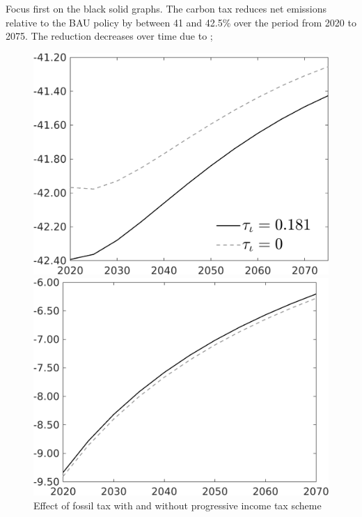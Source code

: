 Focus first on the black solid graphs. The carbon tax reduces net emissions relative to the BAU policy by between 41 and 42.5\% over the period from 2020 to 2075. The reduction decreases over time due to 
; 
\begin{figure}[h!!]
	\centering
	\caption{Effect of fossil tax with and without progressive income tax scheme}\label{fig:CompRegimes}
	\begin{minipage}[]{0.32\textwidth}
		\includegraphics[width=1\textwidth]{../../codding_model/own_basedOnFried/optimalPol_010922_revision/figures/all_13Sept22/PerdifNoTauf_regime0_CompTaul_Emnet_spillover0_nsk0_xgr0_sep1_LFlimit0_emsbase1_countec0_GovRev1_etaa0.79_lgd1.png}
	\end{minipage}	
\begin{minipage}[]{0.32\textwidth}
	\includegraphics[width=1\textwidth]{../../codding_model/own_basedOnFried/optimalPol_010922_revision/figures/all_13Sept22/PerdifNoTauf_regime0_CompTaul_gAagg_spillover0_nsk0_xgr0_sep1_LFlimit0_emsbase1_countec0_GovRev1_etaa0.79_lgd0.png}

\end{minipage}
\end{figure}
